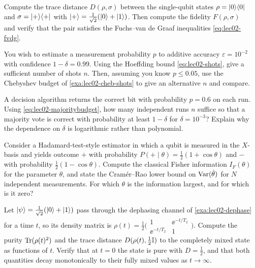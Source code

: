 \begin{exercise}\label{ex:lec02-3}
Compute the trace distance $D(\rho,\sigma)$ between the single-qubit states
$\rho=\ket{0}\!\bra{0}$ and $\sigma=\ket{+}\!\bra{+}$ with $\ket{+}=\tfrac{1}{\sqrt2}(\ket{0}+\ket{1})$.
Then compute the fidelity $F(\rho,\sigma)$ and verify that the pair satisfies the
Fuchs--van de Graaf inequalities \eqref{eq:lec02-fvdg}.
\end{exercise}

\begin{exercise}\label{ex:lec02-4}
You wish to estimate a measurement probability $p$ to additive accuracy
$\varepsilon=10^{-2}$ with confidence $1-\delta=0.99$. Using the Hoeffding bound
\eqref{eq:lec02-shots}, give a sufficient number of shots $n$. Then, assuming you
know $p\le0.05$, use the Chebyshev budget of \cref{exa:lec02-cheb-shots} to give an
alternative $n$ and compare.
\end{exercise}

\begin{exercise}\label{ex:lec02-5}
A decision algorithm returns the correct bit with probability $p=0.6$ on each run.
Using \eqref{eq:lec02-majoritybudget}, how many independent runs $n$ suffice so that
a majority vote is correct with probability at least $1-\delta$ for $\delta=10^{-3}$?
Explain why the dependence on $\delta$ is logarithmic rather than polynomial.
\end{exercise}

\begin{exercise}\label{ex:lec02-6}
Consider a Hadamard-test-style estimator in which a qubit is measured in the
$X$-basis and yields outcome $+$ with probability $P(+\mid\theta)=\tfrac12(1+\cos\theta)$
and $-$ with probability $\tfrac12(1-\cos\theta)$. Compute the classical Fisher
information $I_F(\theta)$ for the parameter $\theta$, and state the Cram\'er--Rao
lower bound on $\operatorname{Var}(\hat\theta)$ for $N$ independent measurements. For which $\theta$
is the information largest, and for which is it zero?
\end{exercise}

\begin{exercise}\label{ex:lec02-7}
Let $\ket{\psi}=\tfrac{1}{\sqrt2}(\ket{0}+\ket{1})$ pass through the dephasing
channel of \cref{exa:lec02-dephase} for a time $t$, so its density matrix is
$\rho(t)=\tfrac12\bigl(\begin{smallmatrix}1&\ee^{-t/T_2}\\ \ee^{-t/T_2}&1\end{smallmatrix}\bigr)$.
Compute the purity $\operatorname{Tr}(\rho(t)^{2})$ and the trace distance
$D(\rho(t),\tfrac12\mathbb{I})$ to the completely mixed state as functions of $t$. Verify
that at $t=0$ the state is pure with $D=\tfrac12$, and that both quantities decay
monotonically to their fully mixed values as $t\to\infty$.
\end{exercise}

